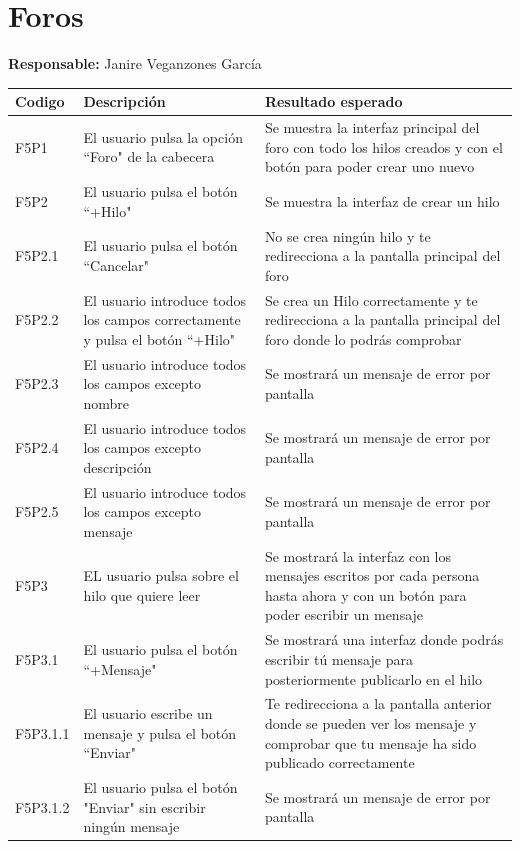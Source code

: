 ﻿\documentclass{report}
\begin{document}
        \section{Foros}
            \begin{center}
                \textbf{Responsable:} Janire Veganzones García\\
                \begin{longtable}{|m{2cm}|m{4cm}|m{4cm}|}
                    \hline
                    Codigo & Descripción & Resultado esperado \\
                    \hline
                    \endhead
                    \hline
                    F5P1 & El usuario pulsa la opción ``Foro" de la cabecera & Se muestra la interfaz principal del foro con todo los hilos creados y con el botón para poder crear uno nuevo \\
                    \hline
                     F5P2 & El usuario pulsa el botón ``+Hilo" & Se muestra la interfaz de crear un hilo \\
                    \hline
                     F5P2.1 & El usuario pulsa el botón ``Cancelar" & No se crea ningún hilo y te redirecciona a la pantalla principal del foro \\
                    \hline
                     F5P2.2 & El usuario introduce todos los campos correctamente y pulsa el botón ``+Hilo" &  Se crea un Hilo correctamente y te redirecciona a la pantalla principal del foro donde lo podrás comprobar\\
                    \hline
                     F5P2.3 & El usuario introduce todos los campos excepto nombre & Se mostrará un mensaje de error por pantalla \\
                    \hline
                    F5P2.4 & El usuario introduce todos los campos excepto descripción & Se mostrará un mensaje de error por pantalla \\
                    \hline
                    F5P2.5 & El usuario introduce todos los campos excepto mensaje & Se mostrará un mensaje de error por pantalla \\
                    \hline
                    F5P3 & EL usuario pulsa sobre el hilo que quiere leer & Se mostrará la interfaz con los mensajes escritos por cada persona hasta ahora y con un botón para poder escribir un mensaje \\
                    \hline
                    F5P3.1 & El usuario pulsa el botón  ``+Mensaje" & Se mostrará una interfaz donde podrás escribir tú mensaje para posteriormente publicarlo en el hilo \\
                    \hline
                    F5P3.1.1 & El usuario escribe un mensaje y pulsa el botón ``Enviar" & Te redirecciona a la pantalla anterior donde se pueden ver los mensaje y comprobar que tu mensaje ha sido publicado correctamente \\
                    \hline
                    F5P3.1.2 & El usuario pulsa el botón "Enviar" sin escribir ningún mensaje & Se mostrará un mensaje de error por pantalla  \\
                    \hline
                \end{longtable}
            \end{center}
            \clearpage
\end{document}
